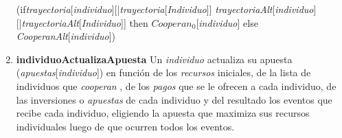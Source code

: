 \documentclass[10pt,a4paper]{article}
\begin{document}
\begin{enumerate}
    {(if\textit{trayectoria}[\textit{individuo}][|{\textit{trayectoria}[\textit{Individuo}]}]
     \geq \textit{trayectoriaAlt}[\textit{individuo}][|{\textit{trayectoriaAlt}[\textit{Individuo}]}] then \textit{$Cooperan_{0}$}[\textit{individuo}] else \textit{CooperanAlt}[\textit{individuo}])}

     \item \textbf{individuoActualizaApuesta} Un \textit{individuo} actualiza su apuesta (\textit{apuestas}[\textit{individuo}]) en función de los \textit{recursos} iniciales, de la lista de individuos que \textit{cooperan} , de los \textit{pagos} que se le ofrecen a cada individuo, de las inversiones o \textit{apuestas} de cada individuo y del resultado los eventos que recibe cada individuo, eligiendo la apuesta que maximiza sus recursos individuales luego de que ocurren todos los eventos.


\end{enumerate}
\end{document}

